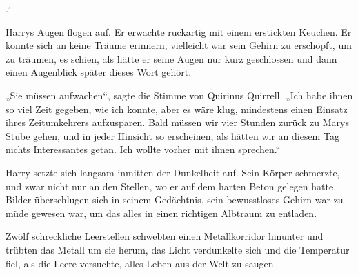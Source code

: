 
.“

\hplettrineextrapara
Harrys Augen flogen auf. Er erwachte ruckartig mit einem erstickten Keuchen. Er konnte sich an keine Träume erinnern, vielleicht war sein Gehirn zu erschöpft, um zu träumen, es schien, als hätte er seine Augen nur kurz geschlossen und dann einen Augenblick später dieses Wort gehört.

„Sie müssen aufwachen“, sagte die Stimme von Quirinus Quirrell.
„Ich habe ihnen so viel Zeit gegeben, wie ich konnte, aber es wäre klug, mindestens einen Einsatz ihres Zeitumkehrers aufzusparen. Bald müssen wir vier Stunden zurück zu Marys Stube gehen, und in jeder Hinsicht so erscheinen, als hätten wir an diesem Tag nichts Interessantes getan. Ich wollte vorher mit ihnen sprechen.“

Harry setzte sich langsam inmitten der Dunkelheit auf. Sein Körper schmerzte, und zwar nicht nur an den Stellen, wo er auf dem harten Beton gelegen hatte. Bilder überschlugen sich in seinem Gedächtnis, sein bewusstloses Gehirn war zu müde gewesen war, um das alles in einen richtigen Albtraum zu entladen.

Zwölf schreckliche Leerstellen schwebten einen Metallkorridor hinunter und trübten das Metall um sie herum, das Licht verdunkelte sich und die Temperatur fiel, als die Leere versuchte, alles Leben aus der Welt zu saugen —

